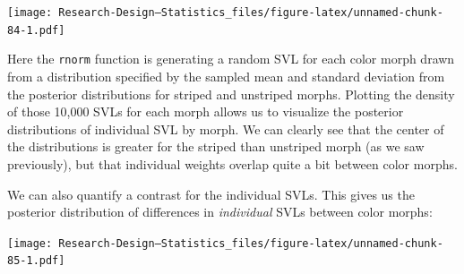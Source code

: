 \documentclass[
]{book}
\newenvironment{Shaded}{\begin{snugshade}}{\end{snugshade}}
\newcommand{\AttributeTok}[1]{\textcolor[rgb]{0.13,0.29,0.53}{#1}}
\newcommand{\CommentTok}[1]{\textcolor[rgb]{0.56,0.35,0.01}{\textit{#1}}}
\newcommand{\DecValTok}[1]{\textcolor[rgb]{0.00,0.00,0.81}{#1}}
\newcommand{\FloatTok}[1]{\textcolor[rgb]{0.00,0.00,0.81}{#1}}
\newcommand{\FunctionTok}[1]{\textcolor[rgb]{0.13,0.29,0.53}{\textbf{#1}}}
\newcommand{\NormalTok}[1]{#1}
\newcommand{\OtherTok}[1]{\textcolor[rgb]{0.56,0.35,0.01}{#1}}
\newcommand{\SpecialCharTok}[1]{\textcolor[rgb]{0.81,0.36,0.00}{\textbf{#1}}}
\newcommand{\StringTok}[1]{\textcolor[rgb]{0.31,0.60,0.02}{#1}}
\begin{document}
\texttt{[image: Research-Design---Statistics\_files/figure-latex/unnamed-chunk-84-1.pdf]}

Here the \texttt{rnorm} function is generating a random SVL for each color morph drawn from a distribution specified by the sampled mean and standard deviation from the posterior distributions for striped and unstriped morphs. Plotting the density of those 10,000 SVLs for each morph allows us to visualize the posterior distributions of individual SVL by morph. We can clearly see that the center of the distributions is greater for the striped than unstriped morph (as we saw previously), but that individual weights overlap quite a bit between color morphs.

We can also quantify a contrast for the individual SVLs. This gives us the posterior distribution of differences in \emph{individual} SVLs between color morphs:

\begin{Shaded}
\end{Shaded}

\texttt{[image: Research-Design---Statistics\_files/figure-latex/unnamed-chunk-85-1.pdf]}

\begin{Shaded}
\end{Shaded}
\end{document}
